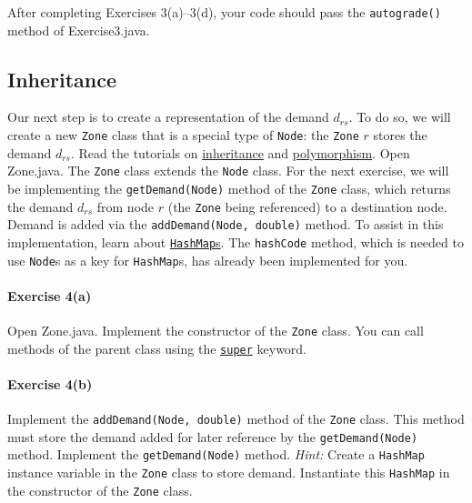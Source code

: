 \documentclass[12pt]{article}
\begin{document}
 \vspace{\baselineskip}

\noindent
After completing Exercises 3(a)--3(d), your code should pass the \texttt{autograde()} method of Exercise3.java. 




\subsection{Inheritance}
\label{sec32}

Our next step is to create a representation of the demand $d_{rs}$. To do so, we will create a new \texttt{Zone} class that is a special type of \texttt{Node}: the \texttt{Zone} $r$ stores the demand $d_{rs}$. Read the tutorials on \href{https://www.w3schools.com/java/java_inheritance.asp}{inheritance} and \href{https://www.w3schools.com/java/java_polymorphism.asp}{polymorphism}. Open Zone.java. 
The \texttt{Zone} class extends the \texttt{Node} class. 
For the next exercise, we will be implementing the \texttt{getDemand(Node)} method of the \texttt{Zone} class, which returns the demand $d_{rs}$ from node $r$ (the \texttt{Zone} being referenced) to a destination node. 
Demand is added via the \texttt{addDemand(Node, double)} method. 
To assist in this implementation, learn about \href{https://www.w3schools.com/java/java_hashmap.asp}{\texttt{HashMap}s}. The \texttt{hashCode} method, which is needed to use \texttt{Node}s as a key for \texttt{HashMap}s, has already been implemented for you.  
	
	
\paragraph*{Exercise 4(a)} Open Zone.java. Implement the constructor of the \texttt{Zone} class. You can call methods of the parent class using the \href{https://www.w3schools.com/java/ref_keyword_super.asp}{\texttt{super}} keyword.

\paragraph*{Exercise 4(b)} Implement the \texttt{addDemand(Node, double)} method of the \texttt{Zone} class. This method must store the demand added for later reference by the \texttt{getDemand(Node)} method. Implement the \texttt{getDemand(Node)} method. \textit{Hint: } Create a \texttt{HashMap} instance variable in the \texttt{Zone} class to store demand. Instantiate this \texttt{HashMap} in the constructor of the \texttt{Zone} class. 
\end{document}
